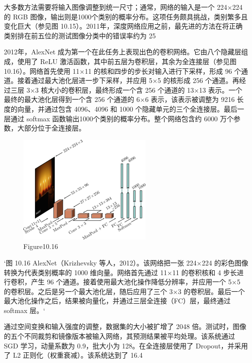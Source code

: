 大多数方法需要将输入图像调整到统一尺寸；通常，网络的输入是一个 224×224 的 RGB 图像，输出则是1000个类别的概率分布。这项任务颇具挑战，类别繁多且变化巨大（参见图 10.15）。2011年，深度网络应用之前，最先进的方法在将正确类别排在前五位的测试图像分类中的错误率约为 25%

2012年，AlexNet 成为第一个在此任务上表现出色的卷积网络。它由八个隐藏层组成，使用了 ReLU 激活函数，其中前五层为卷积层，其余为全连接层（参见图 10.16）。网络首先使用 11×11 的核和四步的步长对输入进行下采样，形成 96 个通道。接着通过最大池化层进一步下采样，并应用 5×5 的核形成 256 个通道。再经过三层 3×3 核大小的卷积层，最终形成一个含 256 个通道的 13×13 表示。一个最终的最大池化层得到一个含 256 个通道的 6×6 表示，该表示被调整为 9216 长度的向量，并通过包含 4096、4096 和 1000 个隐藏单元的三个全连接层。最后一层通过 softmax 函数输出1000个类别的概率分布。整个网络包含约 6000 万个参数，大部分位于全连接层。

\begin{figure}[h!]
\centering
\includegraphics[width=0.7\linewidth]{png/chapter10/ConvAlex.png}
\caption{Figure10.16}
\end{figure}

`图 10.16 AlexNet（Krizhevsky 等人，2012）。该网络把一张 224×224 的彩色图像转换为代表类别概率的 1000 维向量。网络首先通过 11×11 的卷积核和 4 步长进行卷积，产生 96 个通道。接着使用最大池化操作降低分辨率，并应用一个 5×5 的卷积层。之后是另一个最大池化层，随后应用了三个 3×3 的卷积层。最后一个最大池化操作之后，结果被向量化，并通过三层全连接（FC）层，最终通过 softmax 层。`

通过空间变换和输入强度的调整，数据集的大小被扩增了 2048 倍。测试时，图像的五个不同裁剪和镜像版本被输入网络，其预测结果被平均处理。该系统通过 SGD 学习，动量系数为 0.9，批大小为 128。在全连接层使用了 Dropout，并采用了 L2 正则化（权重衰减）。该系统达到了 16.4%

